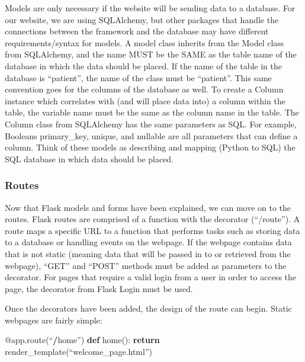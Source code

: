 \documentclass[]{book}
\newenvironment{Shaded}{\begin{snugshade}}{\end{snugshade}}
\newcommand{\AttributeTok}[1]{\textcolor[rgb]{0.77,0.63,0.00}{#1}}
\newcommand{\ControlFlowTok}[1]{\textcolor[rgb]{0.13,0.29,0.53}{\textbf{#1}}}
\newcommand{\KeywordTok}[1]{\textcolor[rgb]{0.13,0.29,0.53}{\textbf{#1}}}
\newcommand{\NormalTok}[1]{#1}
\newcommand{\OperatorTok}[1]{\textcolor[rgb]{0.81,0.36,0.00}{\textbf{#1}}}
\begin{document}
Models are only necessary if the website will be sending data to a database. For our website, we are using SQLAlchemy, but other packages that handle the connections between the framework and the database may have different requirements/syntax for models. A model class inherits from the Model class from SQLAlchemy, and the name MUST be the SAME as the table name of the database in which the data should be placed. If the name of the table in the database is ``patient'', the name of the class must be ``patient''. This same convention goes for the columns of the database as well. To create a Column instance which correlates with (and will place data into) a column within the table, the variable name must be the same as the column name in the table. The Column class from SQLAlchemy has the same parameters as SQL. For example, Booleans primary\_key, unique, and nullable are all parameters that can define a column. Think of these models as describing and mapping (Python to SQL) the SQL database in which data should be placed.

\hypertarget{routes}{%
\subsubsection{Routes}\label{routes}}

Now that Flask models and forms have been explained, we can move on to the routes. Flask routes are comprised of a function with the decorator \citet{app.route}(``/route''). A route maps a specific URL to a function that performs tasks such as storing data to a database or handling events on the webpage. If the webpage contains data that is not static (meaning data that will be passed in to or retrieved from the webpage), ``GET'' and ``POST'' methods must be added as parameters to the decorator. For pages that require a valid login from a user in order to access the page, the decorator \citet{login_required} from Flask Login must be used.

Once the decorators have been added, the design of the route can begin. Static webpages are fairly simple:

\begin{Shaded}
\begin{Highlighting}[]
\AttributeTok{@app.route}\NormalTok{(“}\OperatorTok{/}\NormalTok{home”)}
\KeywordTok{def}\NormalTok{ home():}
\ControlFlowTok{return}\NormalTok{ render_template(“welcome_page.html”)}
\end{Highlighting}
\end{Shaded}
\end{document}
